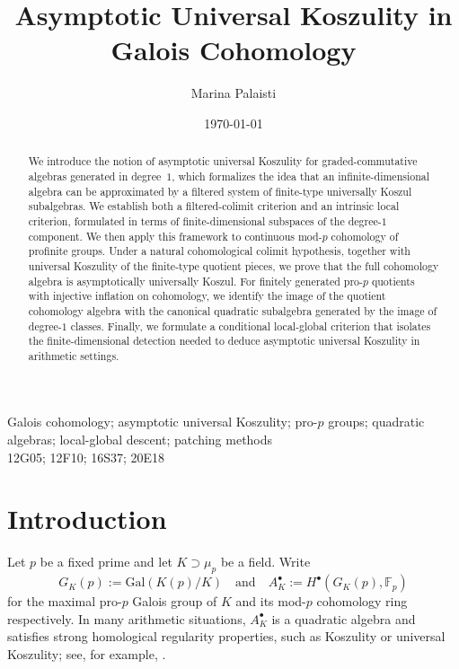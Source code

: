 \documentclass[11pt]{amsart}
\title[Asymptotic Universal Koszulity]{Asymptotic Universal Koszulity in Galois Cohomology}
\author{Marina Palaisti}
\date{\today}
\numberwithin{equation}{section}
\theoremstyle{definition}
\begin{document}
	
	\maketitle
	
	
	\begin{abstract}
		We introduce the notion of asymptotic universal Koszulity for graded-commutative algebras generated in degree~$1$, which formalizes the idea that an infinite-dimensional algebra can be approximated by a filtered system of finite-type universally Koszul subalgebras. We establish both a filtered-colimit criterion and an intrinsic local criterion, formulated in terms of finite-dimensional subspaces of the degree-$1$ component. We then apply this framework to continuous mod-$p$ cohomology of profinite groups. Under a natural cohomological colimit hypothesis, together with universal Koszulity of the finite-type quotient pieces, we prove that the full cohomology algebra is asymptotically universally Koszul. For finitely generated pro-$p$ quotients with injective inflation on cohomology, we identify the image of the quotient cohomology algebra with the canonical quadratic subalgebra generated by the image of degree-$1$ classes. Finally, we formulate a conditional local-global criterion that isolates the finite-dimensional detection needed to deduce asymptotic universal Koszulity in arithmetic settings.
	\end{abstract}
	
	 Galois cohomology; asymptotic universal Koszulity; pro-$p$ groups; quadratic algebras; local-global descent; patching methods\\
	
	 12G05; 12F10; 16S37; 20E18
	
	
	\section{Introduction}
	
	Let \(p\) be a fixed prime and let \(K\supset \mu_p\) be a field. Write
	\[G_K(p) := \mathrm{Gal}(K(p)/K)\quad\text{and}\quad A_K^\bullet := H^\bullet(G_K(p),\mathbb{F}_p) \]
	for the maximal pro-\(p\) Galois group of \(K\) and its mod-\(p\) cohomology ring respectively. In many arithmetic situations, \(A_K^\bullet\) is a quadratic algebra \cite{MinacPasiniQuadrelliTan,Voevodsky} and satisfies strong homological regularity properties, such as Koszulity or universal Koszulity; see, for example, \cite{MinacPalaistiPasiniTan,PositselskiKoszul,Quadrelli}. 
	
\end{document}
